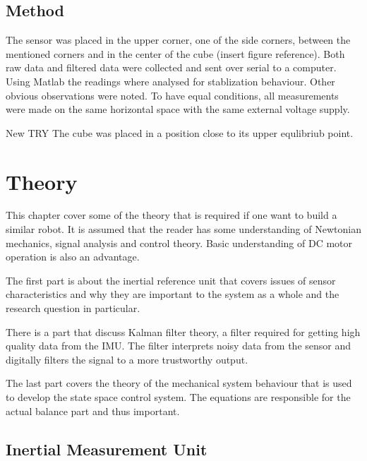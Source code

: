 \documentclass[a4paper,11pt]{kth-mag}
\begin{document}
\section{Method}
The sensor was placed in the upper corner, one of the side corners, between the mentioned corners and in the center of the cube (insert figure reference). Both raw data and filtered data were collected and sent over serial to a computer. Using Matlab \cite{MATLAB:2014} the readings where analysed for stablization behaviour. Other obvious observations were noted. To have equal conditions, all measurements were made on the same horizontal space with the same external voltage supply.

New TRY
The cube was placed in a position close to its upper equlibriub point.

\chapter{Theory}
This chapter cover some of the theory that is required if one want to build a similar robot. It is assumed that the reader has some understanding of Newtonian mechanics, signal analysis and control theory. Basic understanding of DC motor operation is also an advantage.

The first part is about the inertial reference unit that covers issues of sensor characteristics and why they are important to the system as a whole and the research question in particular.

There is a part that discuss Kalman filter theory, a filter required for getting high quality data from the IMU. The filter interprets noisy data from the sensor and digitally filters the signal to a more trustworthy output. 

The last part covers the theory of the mechanical system behaviour that is used to develop the state space control system. The equations are responsible for the actual balance part and thus important. 



\section{Inertial Measurement Unit} \label{section:IMU}
\end{document}

